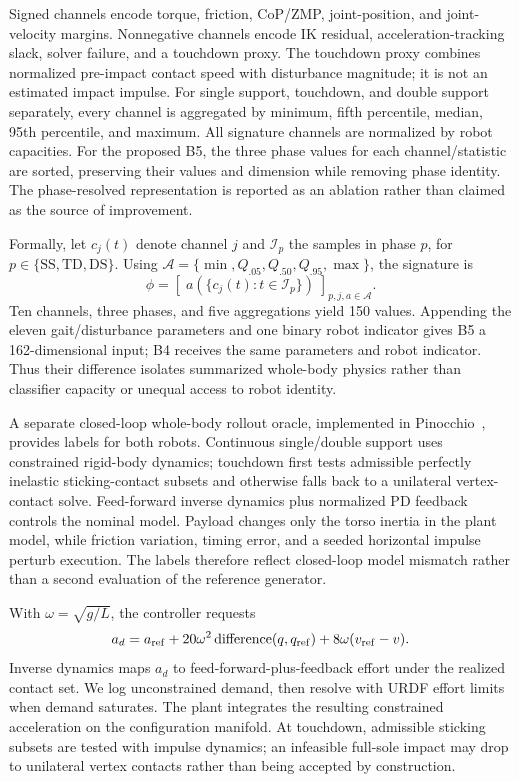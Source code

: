 \documentclass[letterpaper,10pt,conference]{IEEEtran}
\begin{document}
Signed channels encode torque, friction, CoP/ZMP, joint-position, and
joint-velocity margins. Nonnegative channels encode IK residual,
acceleration-tracking slack, solver failure, and a touchdown proxy. The
touchdown proxy combines normalized pre-impact contact speed with disturbance
magnitude; it is not an estimated impact impulse. For single support,
touchdown, and double support separately, every channel is aggregated by
minimum, fifth percentile, median, 95th percentile, and maximum. All signature
channels are normalized by robot capacities. For the proposed B5, the three
phase values for each channel/statistic are sorted, preserving their values and
dimension while removing phase identity. The phase-resolved representation is
reported as an ablation rather than claimed as the source of improvement.

Formally, let $c_j(t)$ denote channel $j$ and $\mathcal{I}_p$ the samples in
phase $p$, for $p\in\{\mathrm{SS},\mathrm{TD},\mathrm{DS}\}$. Using
$\mathcal{A}=\{\min,Q_{.05},Q_{.50},Q_{.95},\max\}$, the signature is
\begin{equation}
 \phi=\left[\;a\!\left(\{c_j(t):t\in\mathcal{I}_p\}\right)\;\right]_{
 p,j,a\in\mathcal{A}} .
\end{equation}
Ten channels, three phases, and five aggregations yield 150 values. Appending
the eleven gait/disturbance parameters and one binary robot indicator gives B5
a 162-dimensional input; B4 receives the same parameters and robot indicator.
Thus their difference isolates summarized whole-body physics rather than
classifier capacity or unequal access to robot identity.

A separate closed-loop whole-body rollout oracle, implemented in
Pinocchio~\cite{carpentier2019pinocchio}, provides labels for both robots.
Continuous single/double support uses constrained rigid-body dynamics;
touchdown first tests admissible perfectly inelastic sticking-contact subsets
and otherwise falls back to a unilateral vertex-contact solve. Feed-forward
inverse dynamics plus normalized PD feedback controls the nominal model.
Payload changes only the torso inertia in the plant model, while friction
variation, timing error, and a seeded horizontal impulse perturb execution. The
labels therefore reflect
closed-loop model mismatch rather than a second evaluation of the reference
generator.

With $\omega=\sqrt{g/L}$, the controller requests
\begin{equation}
 a_d=a_{\rm ref}+20\omega^2\operatorname{difference}(q,q_{\rm ref})
       +8\omega(v_{\rm ref}-v).
\end{equation}
Inverse dynamics maps $a_d$ to feed-forward-plus-feedback effort under the
realized contact set. We log unconstrained demand, then resolve with URDF effort
limits when demand saturates. The plant integrates the resulting constrained
acceleration on the configuration manifold. At touchdown, admissible sticking
subsets are tested with impulse dynamics; an infeasible full-sole impact may
drop to unilateral vertex contacts rather than being accepted by construction.
\end{document}
